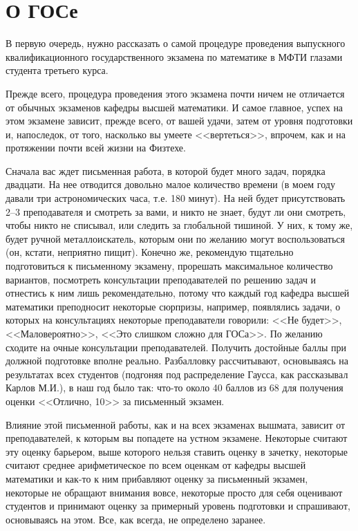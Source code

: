 \chapter[О ГОСе]{О ГОСе\footnotemark}
В первую очередь, нужно рассказать о самой процедуре проведения выпускного квалификационного государственного экзамена по математике в МФТИ глазами студента третьего курса. 

Прежде всего, процедура проведения этого экзамена почти ничем не отличается от обычных экзаменов кафедры высшей математики. 
И самое главное, успех на этом экзамене зависит, прежде всего, от вашей удачи, затем от уровня подготовки и, напоследок, от того, насколько вы умеете <<вертеться>>, впрочем, как и на протяжении почти всей жизни на Физтехе.

Сначала вас ждет письменная работа, в которой будет много задач, порядка двадцати. На нее отводится довольно малое количество времени (в моем году давали три астрономических часа, т.е. 180 минут). На ней будет присутствовать 2--3 преподавателя и смотреть за вами, и никто не знает, будут ли они смотреть, чтобы никто не списывал, или следить за глобальной тишиной. У них, к тому же, будет ручной металлоискатель, которым они по желанию могут воспользоваться (он, кстати, неприятно пищит). Конечно же, рекомендую тщательно подготовиться к письменному экзамену, прорешать максимальное количество вариантов, посмотреть консультации преподавателей по решению задач и отнестись к ним лишь рекомендательно, потому что каждый год кафедра высшей математики преподносит некоторые сюрпризы, например, появлялись задачи, о которых на консультациях некоторые преподаватели говорили: <<Не будет>>, <<Маловероятно>>, <<Это слишком сложно для ГОСа>>. По желанию сходите на очные консультации преподавателей. Получить достойные баллы при должной подготовке вполне реально. Разбалловку рассчитывают, основываясь на результатах всех студентов (подгоняя под распределение Гаусса, как рассказывал Карлов М.И.), в наш год было так: что-то около 40 баллов из 68 для получения оценки <<Отлично, 10>> за письменный экзамен.

Влияние этой письменной работы, как и на всех экзаменах вышмата, зависит от преподавателей, к которым вы попадете на устном экзамене. Некоторые считают эту оценку барьером, выше которого нельзя ставить оценку в зачетку, некоторые считают среднее арифметическое по всем оценкам от кафедры высшей математики и как-то к ним прибавляют оценку за письменный экзамен, некоторые не обращают внимания вовсе, некоторые просто для себя оценивают студентов и принимают оценку за примерный уровень подготовки и спрашивают, основываясь на этом. Все, как всегда, не определено заранее.

